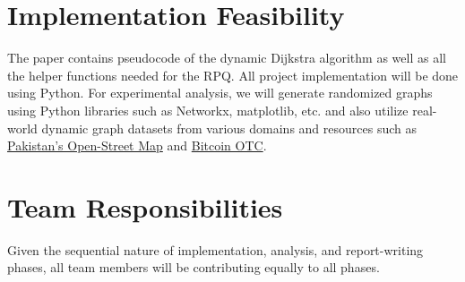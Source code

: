 \documentclass{article}
\begin{document}
\section{Implementation Feasibility}
The paper contains pseudocode of the dynamic Dijkstra algorithm as well as all the helper functions needed for the RPQ. All project implementation will be done using Python. For experimental analysis, we will generate randomized graphs using Python libraries such as Networkx, matplotlib, etc. and also utilize real-world dynamic graph datasets from various domains and resources such as \href{https://download.geofabrik.de/asia/pakistan.html}{Pakistan's Open-Street Map} and \href{https://snap.stanford.edu/data/soc-sign-bitcoin-otc.html}{Bitcoin OTC}.

\section{Team Responsibilities}
Given the sequential nature of implementation, analysis, and report-writing phases, all team members will be contributing equally to all phases.


\end{document}
